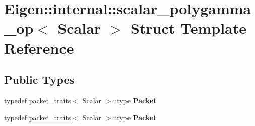 \hypertarget{struct_eigen_1_1internal_1_1scalar__polygamma__op}{}\section{Eigen\+:\+:internal\+:\+:scalar\+\_\+polygamma\+\_\+op$<$ Scalar $>$ Struct Template Reference}
\label{struct_eigen_1_1internal_1_1scalar__polygamma__op}
\subsection*{Public Types}
\begin{DoxyCompactItemize}
\item 
\mbox{\label{struct_eigen_1_1internal_1_1scalar__polygamma__op_a27b21462212c0336d2b3260afef59012}} 
typedef \hyperlink{struct_eigen_1_1internal_1_1packet__traits}{packet\+\_\+traits}$<$ Scalar $>$\+::type {\bfseries Packet}
\item 
\mbox{\label{struct_eigen_1_1internal_1_1scalar__polygamma__op_a27b21462212c0336d2b3260afef59012}} 
typedef \hyperlink{struct_eigen_1_1internal_1_1packet__traits}{packet\+\_\+traits}$<$ Scalar $>$\+::type {\bfseries Packet}
\end{DoxyCompactItemize}
